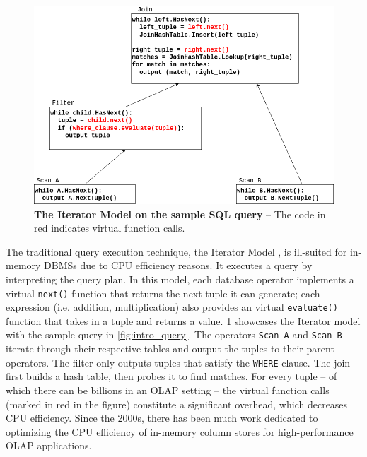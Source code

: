 \documentclass[12pt]{cmuthesis}
\begin{document}
\begin{figure}[t!]
    \centering
    \includegraphics[scale=0.5]{images/Volcano.png}
    \caption{\textbf{The Iterator Model on the sample SQL query} -- The code in red indicates virtual function calls.}
    \label{fig:volcano_graph}
\end{figure}


The traditional query execution technique, the Iterator Model \cite{volcano}, is ill-suited for in-memory DBMSs due to CPU efficiency reasons. It executes a query by interpreting the query plan. In this model, each database operator implements a virtual \texttt{next()} function that returns the next tuple it can generate; each expression (i.e. addition, multiplication) also provides an virtual \texttt{evaluate()} function that takes in a tuple and returns a value. \cref{fig:volcano_graph} showcases the Iterator model with the sample query in \cref{fig:intro_query}. The operators \texttt{Scan A} and \texttt{Scan B} iterate through their respective tables and output the tuples to their parent operators. The filter only outputs tuples that satisfy the \texttt{WHERE} clause. The join first builds a hash table, then probes it to find matches. For every tuple -- of which there can be billions in an OLAP setting -- the virtual function calls (marked in red in the figure) constitute a significant overhead, which decreases CPU efficiency. Since the 2000s, there has been much work dedicated to optimizing the CPU efficiency of in-memory column stores for high-performance OLAP applications.
\end{document}
